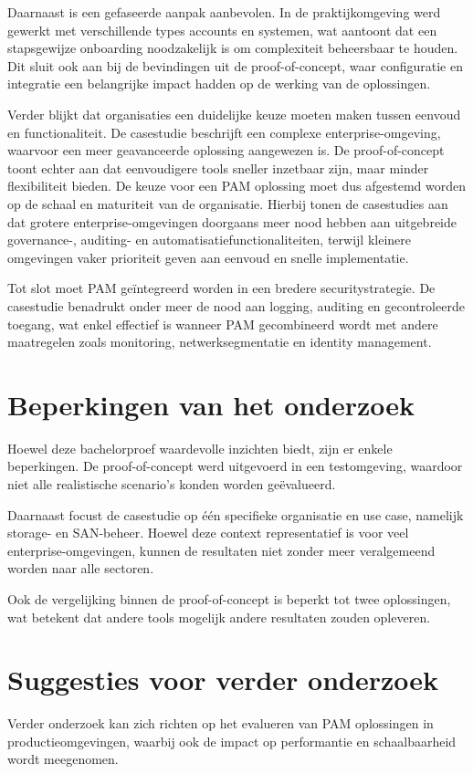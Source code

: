 Daarnaast is een gefaseerde aanpak aanbevolen. In de praktijkomgeving werd gewerkt met verschillende types accounts en systemen, wat aantoont dat een stapsgewijze onboarding noodzakelijk is om complexiteit beheersbaar te houden. Dit sluit ook aan bij de bevindingen uit de proof-of-concept, waar configuratie en integratie een belangrijke impact hadden op de werking van de oplossingen.

Verder blijkt dat organisaties een duidelijke keuze moeten maken tussen eenvoud en functionaliteit. De casestudie beschrijft een complexe enterprise-omgeving, waarvoor een meer geavanceerde oplossing aangewezen is. De proof-of-concept toont echter aan dat eenvoudigere tools sneller inzetbaar zijn, maar minder flexibiliteit bieden. De keuze voor een PAM oplossing moet dus afgestemd worden op de schaal en maturiteit van de organisatie. Hierbij tonen de casestudies aan dat grotere enterprise-omgevingen doorgaans meer nood hebben aan uitgebreide governance-, auditing- en automatisatiefunctionaliteiten, terwijl kleinere omgevingen vaker prioriteit geven aan eenvoud en snelle implementatie.

Tot slot moet PAM geïntegreerd worden in een bredere securitystrategie. De casestudie benadrukt onder meer de nood aan logging, auditing en gecontroleerde toegang, wat enkel effectief is wanneer PAM gecombineerd wordt met andere maatregelen zoals monitoring, netwerksegmentatie en identity management.
\section{Beperkingen van het onderzoek}
Hoewel deze bachelorproef waardevolle inzichten biedt, zijn er enkele beperkingen. De proof-of-concept werd uitgevoerd in een testomgeving, waardoor niet alle realistische scenario’s konden worden geëvalueerd.

Daarnaast focust de casestudie op één specifieke organisatie en use case, namelijk storage- en SAN-beheer. Hoewel deze context representatief is voor veel enterprise-omgevingen, kunnen de resultaten niet zonder meer veralgemeend worden naar alle sectoren.

Ook de vergelijking binnen de proof-of-concept is beperkt tot twee oplossingen, wat betekent dat andere tools mogelijk andere resultaten zouden opleveren.

\section{Suggesties voor verder onderzoek}
Verder onderzoek kan zich richten op het evalueren van PAM oplossingen in productieomgevingen, waarbij ook de impact op performantie en schaalbaarheid wordt meegenomen.

